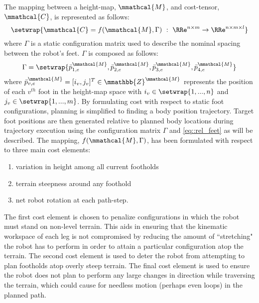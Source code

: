 			The mapping between a height-map,  $\mmathcal{M}$, and cost-tensor, $\mmathcal{C}$, is represented as follows:
				\begin{equation}
					\setwrap{ \mmathcal{C} = f(\mmathcal{M},\Gamma)\text{ }:\text{ }\RRe^{n\times m} \rightarrow \RRe^{n\times m \times l} }
					\label{eq::cost_mapping}
				\end{equation}
			where $\Gamma$ is a static configuration matrix used to describe the nominal spacing between the robot's feet. $\Gamma$ is composed as follows:
				\begin{equation*}
					\Gamma = \setwrap{\bar{p}_{1,e}^{\mmathcal{M}},\bar{p}_{2,e}^{\mmathcal{M}},\bar{p}_{3,e}^{\mmathcal{M}},\bar{p}_{4,e}^{\mmathcal{M}}}
					\label{eq::cost_gamma}
				\end{equation*}
			where $\bar{p}_{v,e}^{\mmathcal{M}}=[i_{v},j_{v}]^{T}\in\mmathbb{Z}^{\mmathcal{M}}$ represents the position of each $v^{th}$ foot in the height-map space with $i_{v}\in \setwrap{1,...,n}$ and $j_{v}\in\setwrap{1,...,m}$. By formulating cost with respect to static foot configurations, planning is simplified to finding a body position trajectory. Target foot positions are then generated relative to planned body locations during trajectory execution using the configuration matrix $\Gamma$ and \ref{eq::rel_feet} as will be described. The mapping, $f(\mmathcal{M},\Gamma)$, has been formulated with respect to three main cost elements:
				\begin{enumerate}
					\item variation in height among all current footholds
					\item terrain steepness around any foothold
					\item net robot rotation at each path-step.
				\end{enumerate}
			The first cost element is chosen to penalize configurations in which the robot must stand on non-level terrain. This aids in ensuring that the kinematic workspace of each leg is not compromised by reducing the amount of ``stretching" the robot has to perform in order to attain a particular configuration atop the terrain. The second cost element is used to deter the robot from attempting to plan footholds atop overly steep terrain. The final cost element is used to ensure the robot does not plan to perform any large changes in direction while traversing the terrain, which could cause for needless motion (perhaps even loops) in the planned path. 

